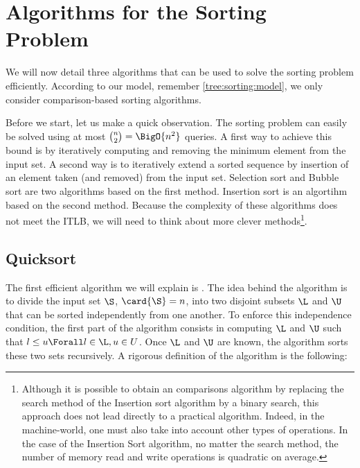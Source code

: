 \section{Algorithms for the Sorting Problem}
\label{tree:sorting:alg}

We will now detail three algorithms that can be used to solve the sorting
problem efficiently. According to our model, remember \ref{tree:sorting:model},
we only consider comparison-based sorting algorithms.


Before we start, let us make a quick observation. The sorting problem can
easily be solved using at most \(\binom{n}{2} = \BigO{n^2}\) queries. A first
way to achieve this bound is by iteratively computing and removing the minimum
element from the input set. A second way is to iteratively
extend a sorted sequence by insertion of an element taken (and removed) from
the input set. Selection sort and Bubble sort are two algorithms based on the
first method. Insertion sort is an algortihm based on the second method.
Because the complexity of these algorithms does not meet the ITLB, we will need
to think about more clever methods\footnote{Although it is possible to obtain
an  comparisons algorithm by replacing the search method of the
Insertion sort algorithm by a binary search, this approach does not lead directly
to a practical algorithm. Indeed, in the machine-world, one must also take
into account other types of operations. In the case of the Insertion Sort
algorithm, no matter the search method, the number of memory read and write
operations is quadratic on average.}.

\subsection*{Quicksort}

The first efficient algorithm we will explain is \quicksort \cite{hoare:1962}.
The idea behind the \quicksort algorithm is to divide the input set \(\S\),
\(\card{\S} = n\), into two disjoint subsets \(\L\) and \(\U\) that can be
sorted independently from one another. To enforce this independence condition,
the first part of the algorithm consists in computing \(\L\) and \(\U\) such
that \(l \le u \Forall l \in \L, u \in U\). Once \(\L\) and \(\U\) are known,
the algorithm sorts these two sets recursively. A rigorous definition of the
algorithm is the following:

